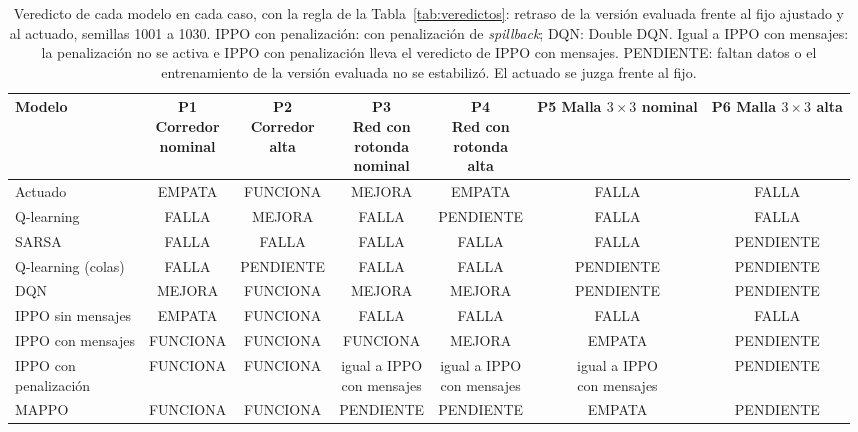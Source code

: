 \begin{table}[!tbp]
\centering
\scriptsize
\setlength{\tabcolsep}{3pt}
\begin{tabular}{lcccccc}
\toprule
Modelo & \makecell{P1\\Corredor\\nominal} & \makecell{P2\\Corredor\\alta} & \makecell{P3\\Red con\\rotonda\\nominal} & \makecell{P4\\Red con\\rotonda\\alta} & \makecell{P5\\Malla $3 \times 3$\\nominal} & \makecell{P6\\Malla $3 \times 3$\\alta} \\
\midrule
Actuado & EMPATA & FUNCIONA & MEJORA & EMPATA & FALLA & FALLA \\
Q-learning & FALLA & MEJORA & FALLA & PENDIENTE & FALLA & FALLA \\
SARSA & FALLA & FALLA & FALLA & FALLA & FALLA & PENDIENTE \\
Q-learning (colas) & FALLA & PENDIENTE & FALLA & FALLA & PENDIENTE & PENDIENTE \\
DQN & MEJORA & FUNCIONA & MEJORA & MEJORA & PENDIENTE & PENDIENTE \\
IPPO sin mensajes & EMPATA & FUNCIONA & FALLA & FALLA & FALLA & FALLA \\
IPPO con mensajes & FUNCIONA & FUNCIONA & FUNCIONA & MEJORA & EMPATA & PENDIENTE \\
\makecell[l]{IPPO con\\penalización} & FUNCIONA & FUNCIONA & \makecell{igual a IPPO\\con mensajes} & \makecell{igual a IPPO\\con mensajes} & \makecell{igual a IPPO\\con mensajes} & PENDIENTE \\
MAPPO & FUNCIONA & FUNCIONA & PENDIENTE & PENDIENTE & EMPATA & PENDIENTE \\
\bottomrule
\end{tabular}
\caption[Veredicto por caso y modelo]{Veredicto de cada modelo en cada caso, con la regla de la Tabla~\ref{tab:veredictos}: retraso de la versión evaluada frente al fijo ajustado y al actuado, semillas 1001 a 1030. IPPO con penalización: con penalización de \textit{spillback}; DQN: Double DQN. Igual a IPPO con mensajes: la penalización no se activa e IPPO con penalización lleva el veredicto de IPPO con mensajes. PENDIENTE: faltan datos o el entrenamiento de la versión evaluada no se estabilizó. El actuado se juzga frente al fijo.}
\label{tab:veredicto-matriz}
\end{table}
